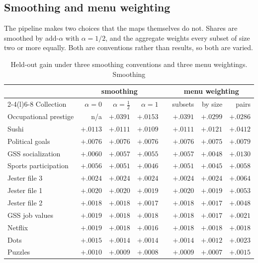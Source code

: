 \documentclass[11pt]{article}
\begin{document}
\subsection{Smoothing and menu weighting}
\label{sec:conventions}

The pipeline makes two choices that the maps themselves do not. Shares are smoothed by
add-$\alpha$ with $\alpha = 1/2$, and the aggregate weights every subset of size two or more
equally. Both are conventions rather than results, so both are varied.

\begin{table}[ht]
\centering
\small
\begin{tabular}{lrrrcrrr}
\toprule
& \multicolumn{3}{c}{smoothing} & & \multicolumn{3}{c}{menu weighting} \\
\cmidrule(r){2-4}\cmidrule(l){6-8}
Collection & $\alpha=0$ & $\alpha=\tfrac12$ & $\alpha=1$ & & subsets & by size & pairs \\
\midrule
Occupational prestige & n/a & $+.0391$ & $+.0153$ & & $+.0391$ & $+.0299$ & $+.0286$ \\
Sushi & $+.0113$ & $+.0111$ & $+.0109$ & & $+.0111$ & $+.0121$ & $+.0412$ \\
Political goals & $+.0076$ & $+.0076$ & $+.0076$ & & $+.0076$ & $+.0075$ & $+.0079$ \\
GSS socialization & $+.0060$ & $+.0057$ & $+.0055$ & & $+.0057$ & $+.0048$ & $+.0130$ \\
Sports participation & $+.0056$ & $+.0051$ & $+.0046$ & & $+.0051$ & $+.0045$ & $+.0058$ \\
Jester file 3 & $+.0024$ & $+.0024$ & $+.0024$ & & $+.0024$ & $+.0024$ & $+.0064$ \\
Jester file 1 & $+.0020$ & $+.0020$ & $+.0019$ & & $+.0020$ & $+.0019$ & $+.0053$ \\
Jester file 2 & $+.0018$ & $+.0018$ & $+.0017$ & & $+.0018$ & $+.0017$ & $+.0048$ \\
GSS job values & $+.0019$ & $+.0018$ & $+.0018$ & & $+.0018$ & $+.0017$ & $+.0021$ \\
Netflix & $+.0019$ & $+.0018$ & $+.0016$ & & $+.0018$ & $+.0018$ & $+.0018$ \\
Dots & $+.0015$ & $+.0014$ & $+.0014$ & & $+.0014$ & $+.0012$ & $+.0023$ \\
Puzzles & $+.0010$ & $+.0009$ & $+.0008$ & & $+.0009$ & $+.0007$ & $+.0015$ \\
\bottomrule
\end{tabular}
\caption{Held-out gain under three smoothing conventions and three menu weightings. Smoothing
}
\end{table}
\end{document}

